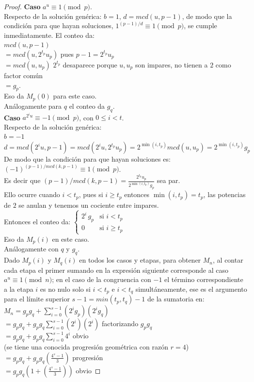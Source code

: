 \begin{proof}
\textbf{Caso} $a^u\equiv 1 \pmod p$. \\
Respecto de la solución genérica: $b=1$, $d=mcd(u,p-1)$, de modo que la condición para que hayan soluciones, $1^{(p-1)/d} \equiv 1 \pmod p$, se cumple inmediatamente. El conteo da: \\
$mcd(u,p-1)$ \\
$= mcd(u,2^{t_p}u_p)$ \qquad pues $p-1 = 2^{t_p}u_p$ \\
$= mcd(u,u_p)$ \qquad \quad $2^{t_p}$ desaparece porque $u,u_p$ son impares, no tienen a $2$ como factor común \\
$= g_p$. \\
Eso da $M_p(0)$ para este caso. \\
Análogamente para $q$ el conteo da $g_q$. \\
\textbf{Caso} $a^{2^iu}\equiv -1 \pmod p$, con $0\leq i < t$. \\
Respecto de la solución genérica: \\
$b=-1$ \\
$d = mcd(2^iu,p-1) = mcd(2^iu,2^{t_p}u_p) = 2^{\min(i,t_p)}mcd(u,u_p) = 2^{\min(i,t_p)}g_p$ \\
De modo que la condición para que hayan soluciones es: $(-1)^{(p-1)/mcd(k,p-1)}\equiv1\pmod p$. \\
Es decir que $(p-1)/mcd(k,p-1) =  \frac{2^{t_p}u_p}{2^{\min(i,t_p)}g_p}$ sea par. \\
Ello ocurre cuando $i<t_p$, pues si $i \geq t_p$ entonces $\min(i,t_p)=t_p$, las potencias de $2$ se anulan y tenemos un cociente entre impares. \\
Entonces el conteo da: 
$\begin{cases}
2^{i}\,g_p & \text{si } i<t_p \\ 0 & \text{si } i\ge t_p
\end{cases}$ \\
Eso da $M_p(i)$ en este caso. \\
Análogamente con $q$ y $g_q$. \\
Dado $M_p(i)$ y $M_q(i)$ en todos los casos y etapas, para obtener $M_n$, al contar cada etapa el primer sumando en la expresión siguiente corresponde al caso $a^u\equiv 1 \pmod n$; en el caso de la congruencia con $-1$ el término correspondiente a la etapa $i$ es no nulo solo si $i<t_p$ e $i<t_q$ simultáneamente, ese es el argumento para el límite superior $s-1=min(t_p,t_q)-1$ de la sumatoria en: \\
$M_n = g_pg_q + \sum_{i=0}^{s-1} (2^i g_p)(2^i g_q)$ \\
$= g_pg_q + g_pg_q \sum_{i=0}^{s-1} (2^i)(2^i)$ \qquad factorizando $g_pg_q$ \\
$= g_pg_q + g_pg_q \sum_{i=0}^{s-1} 4^i$ \qquad\qquad obvio \\
(se tiene una conocida progresión geométrica con razón $r=4$) \\
$= g_pg_q + g_pg_q(\frac{4^s - 1}{3})$ \qquad\qquad\quad  progresión\\
$= g_pg_q(1+(\frac{4^s - 1}{3}))$  \qquad\qquad\qquad  obvio
\end{proof}

